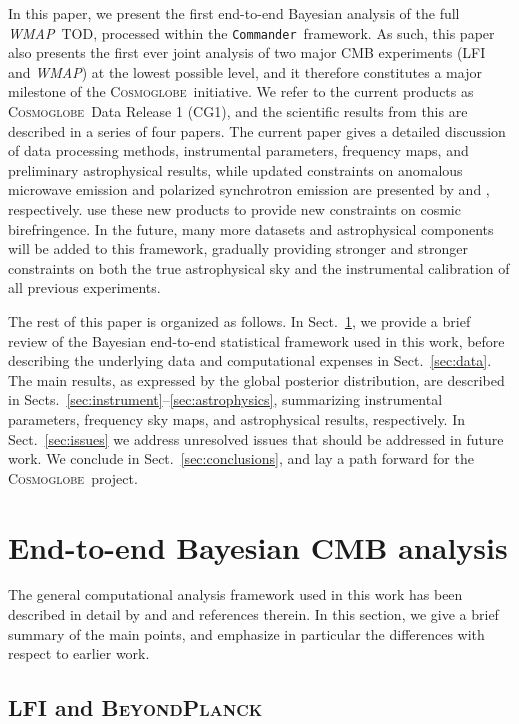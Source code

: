 \documentclass[twocolumn]{../../common/aa}
\def\WMAP{\emph{WMAP}}
\def\commander{\texttt{Commander}}
\newcommand{\bp}{\textsc{BeyondPlanck}}
\newcommand{\cosmoglobe}{\textsc{Cosmoglobe}}
\begin{document}
In this paper, we present the first end-to-end Bayesian analysis of the full \WMAP\ TOD, processed within the \commander\ framework. As such, this paper also presents the first ever joint analysis of two major CMB experiments (LFI and \WMAP) at the lowest possible level, and it therefore constitutes a major milestone of the \cosmoglobe\ initiative. We refer to the current products as \cosmoglobe\ Data Release 1 (CG1), and the scientific results from this are described in a series of four papers. The current paper gives a detailed discussion of data processing methods, instrumental parameters, frequency maps, and preliminary astrophysical results, while updated constraints on anomalous microwave emission and polarized synchrotron emission are presented by \citet{watts2023_ame} and \citet{fuskeland:2023}, respectively. \citet{eskilt:2023} use these new products to provide new constraints on cosmic birefringence. In the future, many more datasets and astrophysical components will be added to this framework, gradually providing stronger and stronger constraints on both the true astrophysical sky and the instrumental calibration of all previous experiments. 

The rest of this paper is organized as follows. In Sect.~\ref{sec:methods}, we provide a brief review of the Bayesian end-to-end statistical framework used in this work, before describing the underlying data and computational expenses in Sect.~\ref{sec:data}. The main results, as expressed by the global posterior distribution, are described in Sects.~\ref{sec:instrument}--\ref{sec:astrophysics}, summarizing instrumental parameters, frequency sky maps, and astrophysical results, respectively. In Sect.~\ref{sec:issues} we address unresolved issues that should be addressed in future work. We conclude in Sect.~\ref{sec:conclusions}, and lay a path forward for the \cosmoglobe\ project.

\section{End-to-end Bayesian CMB analysis}
\label{sec:methods}

The general computational analysis framework used in this work has been described in detail by \citet{bp01} and \citet{bp17} and references therein. In this section, we give a brief summary of the main points, and emphasize in particular the differences with respect to earlier work. 

\subsection{LFI and \bp}
\label{sec:lfi_bp}
\end{document}
